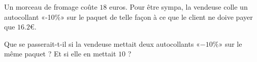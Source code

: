 
\begin{exercice}\label{exosmath-0041}

    Un morceau de fromage coûte $18$ euros. Pour être sympa, la vendeuse colle un autocollant «-10\%» sur le paquet de telle façon à ce que le client ne doive payer que \( 16.2\)€.

    Que se passerait-t-il si la vendeuse mettait deux autocollants «$-10\%$» sur le même paquet ? Et si elle en mettait \( 10\) ?

\end{exercice}
